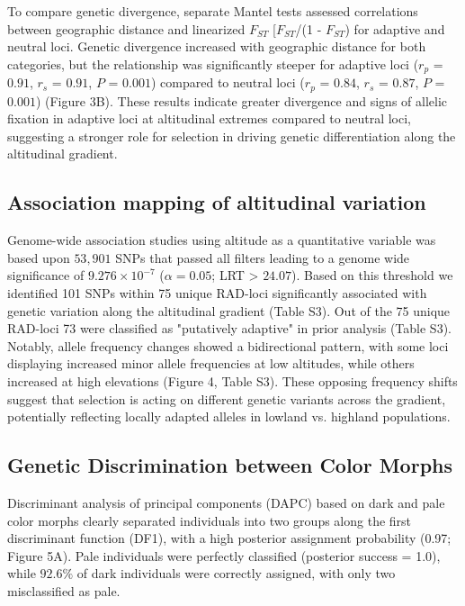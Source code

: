 \documentclass[9pt,a4paper,twoside]{rho-class/rho}
\begin{document}
        To compare genetic divergence, separate Mantel tests assessed correlations between geographic distance and linearized $F_{ST}$ [$F_{ST}$/(1 - $F_{ST}$) for adaptive and neutral loci. Genetic divergence increased with geographic distance for both categories, but the relationship was significantly steeper for adaptive loci (\textit{$r_p$} = $0.91$, \textit{$r_s$} = $0.91$, \textit{$P$} = $0.001$) compared to neutral loci (\textit{$r_p$} = $0.84$, \textit{$r_s$} = $0.87$, \textit{$P$} = $0.001$) (Figure 3B). These results indicate greater divergence and signs of allelic fixation in adaptive loci at altitudinal extremes compared to neutral loci, suggesting a stronger role for selection in driving genetic differentiation along the altitudinal gradient.

    \subsection{Association mapping of altitudinal variation}

        Genome-wide association studies using altitude as a quantitative variable was based upon $53,901$ SNPs that passed all filters leading to a genome wide significance of $9.276\times10^{-7}$ ($\alpha = 0.05$; LRT > $24.07$). Based on this threshold we identified 101 SNPs within 75 unique RAD-loci significantly associated with genetic variation along the altitudinal gradient (Table S3). Out of the 75 unique RAD-loci 73 were classified as "putatively adaptive" in prior analysis (Table S3). Notably, allele frequency changes showed a bidirectional pattern, with some loci displaying increased minor allele frequencies at low altitudes, while others increased at high elevations (Figure 4, Table S3). These opposing frequency shifts suggest that selection is acting on different genetic variants across the gradient, potentially reflecting locally adapted alleles in lowland vs. highland populations.
        
    \subsection{Genetic Discrimination between Color Morphs}

        Discriminant analysis of principal components (DAPC) based on dark and pale color morphs clearly separated individuals into two groups along the first discriminant function (DF1), with a high posterior assignment probability (0.97; Figure 5A). Pale individuals were perfectly classified (posterior success = 1.0), while $92.6\%$ of dark individuals were correctly assigned, with only two misclassified as pale.
   
\end{document}
